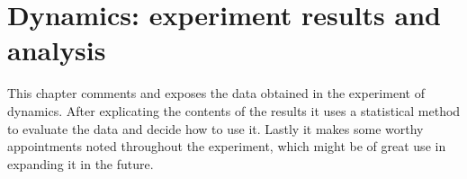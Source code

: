 \chapter{Dynamics: experiment results and analysis}

This chapter comments and exposes the data obtained in the experiment of dynamics. After explicating the contents of the results it uses a statistical method to evaluate the data and decide how to use it. Lastly it makes some worthy appointments noted throughout the experiment, which might be of great use in expanding it in the future.



